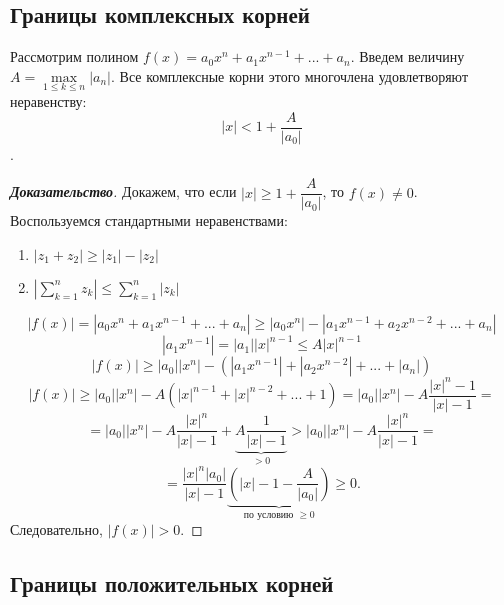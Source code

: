 \documentclass[12pt]{article}
\begin{document}
\subsection{Границы комплексных корней}
\begin{thm}
Рассмотрим полином $f(x) = a_0x^n + a_1x^{n-1} + ... + a_n.$ Введем величину $A = \max\limits_{1 \leq k \leq n} |a_n|$.
Все комплексные корни этого многочлена удовлетворяют неравенству: $$|x| < 1 + \frac{A}{|a_0|}$$.
\end{thm}
\begin{proof}[\textbf{Доказательство}]
Докажем, что если $|x| \geq 1 + \dfrac{A}{|a_0|}$, то $f(x) \neq 0$. \\
\indent Воспользуемся стандартными неравенствами:
\begin{enumerate}
\item $|z_1 + z_2| \geq |z_1| - |z_2|$
\item $|\sum\limits_{k=1}^n z_k| \leq \sum\limits_{k=1}^n |z_k|$
\end{enumerate}
$$|f(x)| = |a_0x^n + a_1x^{n-1} + ... + a_n| \geq |a_0x^n| - |a_1x^{n-1} + a_2x^{n-2} + ... + a_n|$$
$$|a_1x^{n-1}| = |a_1||x|^{n-1} \leq A|x|^{n-1}$$
$$|f(x)| \geq |a_0||x^n| - (|a_1x^{n-1}| + |a_2x^{n-2}| + ... + |a_n|)$$
$$|f(x)| \geq |a_0||x^n| - A(|x|^{n-1} + |x|^{n-2} + ... + 1) = |a_0||x^n| - A\frac{|x|^n - 1}{|x| - 1} =$$
$$= |a_0||x^n| - A\frac{|x|^n}{|x| - 1} + \underbrace{A\frac{1}{|x| - 1}}_{>0} > |a_0||x^n| - A\frac{|x|^n}{|x| - 1} =$$
$$= \frac{|x|^n|a_0|}{|x| - 1}\underbrace{(|x| - 1 - \frac{A}{|a_0|})}_{\text{по условию }\geq 0} \geq 0.$$
\indent Следовательно, $|f(x)| > 0$.
\end{proof}

\subsection{Границы положительных корней}
\end{document}
